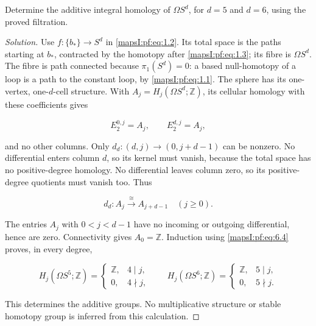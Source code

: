 \begin{example}
\label{mapsI:pf:exercise:6.2} Determine the additive integral homology of \(\Omega S^d\), for \(d=5\) and \(d=6\), using the proved filtration.

\end{example}
\begin{proof}[Solution] Use \(f:\{b_*\}\to S^d\) in \eqref{mapsI:pf:eq:1.2}. Its total space is the paths starting at \(b_*\), contracted by the homotopy after \eqref{mapsI:pf:eq:1.3}; its fibre is \(\Omega S^d\). The fibre is path connected because \(\pi_1(S^d)=0\): a based null-homotopy of a loop is a path to the constant loop, by \eqref{mapsI:pf:eq:1.1}. The sphere has its one-vertex, one-\(d\)-cell structure. With \(A_j=H_j(\Omega S^d;\mathbb Z)\), its cellular homology with these coefficients gives

\begin{equation}
E_2^{0,j}=A_j,\qquad E_2^{d,j}=A_j,
\label{mapsI:pf:eq:6.3}
\end{equation}

and no other columns. Only \(d_d:(d,j)\to(0,j+d-1)\) can be nonzero. No differential enters column \(d\), so its kernel must vanish, because the total space has no positive-degree homology. No differential leaves column zero, so its positive-degree quotients must vanish too. Thus

\begin{equation}
d_d:A_j\xrightarrow{\ \cong\ }A_{j+d-1}\quad(j\geq0).
\label{mapsI:pf:eq:6.4}
\end{equation}

The entries \(A_j\) with \(0<j<d-1\) have no incoming or outgoing differential, hence are zero. Connectivity gives \(A_0=\mathbb Z\). Induction using \eqref{mapsI:pf:eq:6.4} proves, in every degree,

\begin{equation}
H_j(\Omega S^5;\mathbb Z)=
\begin{cases}\mathbb Z,&4\mid j,\\0,&4\nmid j,\end{cases}
\qquad
H_j(\Omega S^6;\mathbb Z)=
\begin{cases}\mathbb Z,&5\mid j,\\0,&5\nmid j.\end{cases}
\label{mapsI:pf:eq:6.5}
\end{equation}

This determines the additive groups. No multiplicative structure or stable homotopy group is inferred from this calculation.
\end{proof}

